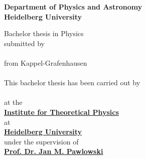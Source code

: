 {\hypersetup{allcolors=black}
\begin{titlepage}

	\begin{center}
		\makeatletter
		\vspace{2cm}
		\Large\textbf{Department of Physics and Astronomy\\
			Heidelberg University}
		
		\vfill
		\normalsize
		Bachelor thesis in Physics\\
		\normalsize
		submitted by\\[0.4cm]
		\Large
		\textbf{\href{mailto:m.kaltschmidt@thphys.uni-heidelberg.de}{\@author}}\\[0.4cm]
		\normalsize
		from Kappel-Grafenhausen \\ [1cm]

		\cleardoublepage
		\thispagestyle{empty}
		\LARGE\textbf{\@title}\\[.4cm]

		\vfill
		\normalsize
		This bachelor thesis has been carried out by \\ 
		\vspace{3pt}
		\textbf{\href{mailto:m.kaltschmidt@thphys.uni-heidelberg.de}{\@author}}  \\ 
		\vspace{3pt}
		at the\\
		\vspace{3pt}
		\textbf{\href{https://www.thphys.uni-heidelberg.de}{Institute for Theoretical Physics}} \\ at \\\textbf{\href{https://www.uni-heidelberg.de}{Heidelberg University}}\\
		\vspace{5pt}
		under the supervision of\\
		\vspace{5pt}
		\textbf{\href{https://www.thphys.uni-heidelberg.de/~pawlowski/}{Prof. Dr. Jan M. Pawlowski}} 
		
		\makeatother
	\end{center}
\cleardoublepage
\end{titlepage}}